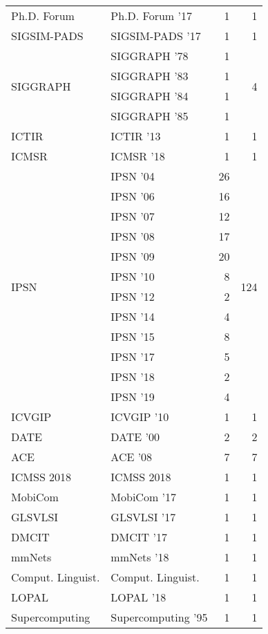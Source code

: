 \begin{table*}[t]
\begin{tabular}{llrr}
\multirow{1}{*}{Ph.D. Forum } & Ph.D. Forum '17 & 1 & \multirow{1}{*}{1}\\
\multirow{1}{*}{SIGSIM-PADS } & SIGSIM-PADS '17 & 1 & \multirow{1}{*}{1}\\
\multirow{4}{*}{SIGGRAPH } & SIGGRAPH '78 & 1 & \multirow{4}{*}{4}\\
& SIGGRAPH '83 & 1 &\\
& SIGGRAPH '84 & 1 &\\
& SIGGRAPH '85 & 1 &\\
\multirow{1}{*}{ICTIR } & ICTIR '13 & 1 & \multirow{1}{*}{1}\\
\multirow{1}{*}{ICMSR } & ICMSR '18 & 1 & \multirow{1}{*}{1}\\
\multirow{12}{*}{IPSN } & IPSN '04 & 26 & \multirow{12}{*}{124}\\
& IPSN '06 & 16 &\\
& IPSN '07 & 12 &\\
& IPSN '08 & 17 &\\
& IPSN '09 & 20 &\\
& IPSN '10 & 8 &\\
& IPSN '12 & 2 &\\
& IPSN '14 & 4 &\\
& IPSN '15 & 8 &\\
& IPSN '17 & 5 &\\
& IPSN '18 & 2 &\\
& IPSN '19 & 4 &\\
\multirow{1}{*}{ICVGIP } & ICVGIP '10 & 1 & \multirow{1}{*}{1}\\
\multirow{1}{*}{DATE } & DATE '00 & 2 & \multirow{1}{*}{2}\\
\multirow{1}{*}{ACE } & ACE '08 & 7 & \multirow{1}{*}{7}\\
\multirow{1}{*}{ICMSS 2018} & ICMSS 2018 & 1 & \multirow{1}{*}{1}\\
\multirow{1}{*}{MobiCom } & MobiCom '17 & 1 & \multirow{1}{*}{1}\\
\multirow{1}{*}{GLSVLSI } & GLSVLSI '17 & 1 & \multirow{1}{*}{1}\\
\multirow{1}{*}{DMCIT } & DMCIT '17 & 1 & \multirow{1}{*}{1}\\
\multirow{1}{*}{mmNets } & mmNets '18 & 1 & \multirow{1}{*}{1}\\
\multirow{1}{*}{Comput. Linguist.} & Comput. Linguist. & 1 & \multirow{1}{*}{1}\\
\multirow{1}{*}{LOPAL } & LOPAL '18 & 1 & \multirow{1}{*}{1}\\
\multirow{1}{*}{Supercomputing } & Supercomputing '95 & 1 & \multirow{1}{*}{1}\\

\end{tabular}
\end{table*}
